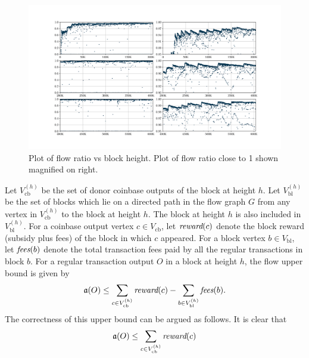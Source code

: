 \begin{figure}[t]
  \centering
  \captionsetup{justification=centering}
  \includegraphics[width=\textwidth, trim={10cm 6cm 9cm 5cm},clip]{Figures/ratio_compact1-1.png}
  \vspace{-10pt}
  \caption{Plot of flow ratio vs block height. Plot of flow ratio close to 1 shown magnified on right.}
  \label{ratio-plot}
\end{figure}
Let $V_{\text{cb}}^{(h)}$ be the set of donor coinbase outputs of the block at height $h$. Let $V_{\text{bl}}^{(h)}$ be the set of blocks which lie on a directed path in the flow graph $G$ from any vertex in $V_{\text{cb}}^{(h)}$ to the block at height $h$. The block at height $h$ is also included in $V_{\text{bl}}^{(h)}$.
For a coinbase output vertex $c \in V_{\text{cb}}$, let $\textit{reward}(c)$ denote the block reward (subsidy plus fees) of the block in which $c$ appeared.
For a block vertex $b \in V_{\text{bl}}$, let $\textit{fees}(b)$ denote the total transaction fees paid by all the regular transactions in block $b$.
For a regular transaction output $O$ in a block at height $h$, the flow upper bound is given by
\begin{align}
  \mathfrak{a}(O) \le \sum_{c \in V_{\text{cb}}^{(h)}} \textit{reward}(c) - \sum_{b \in V_{\text{bl}}^{(h)}} \textit{fees}(b).
  \label{eqn:FLUB}
\end{align}
The correctness of this upper bound can be argued as follows. It is clear that
\begin{align}
\mathfrak{a}(O) \le \sum_{c \in V_{\text{cb}}^{(h)}} \textit{reward}(c)
\end{align}
